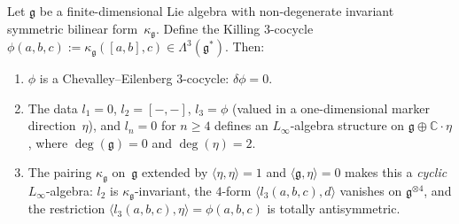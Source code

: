 \begin{proposition}\label{prop:killing-linf-extension}
Let $\mathfrak{g}$ be a finite-dimensional Lie algebra with
non-degenerate invariant symmetric bilinear form~$\kappa_{\mathfrak{g}}$.
Define the Killing $3$-cocycle
$\phi(a,b,c) := \kappa_{\mathfrak{g}}([a,b],c) \in \Lambda^3(\mathfrak{g}^*)$.
Then:
\begin{enumerate}[label=\textup{(\roman*)}]
\item $\phi$ is a Chevalley--Eilenberg $3$-cocycle:
 $\delta\phi = 0$.
\item The data $l_1 = 0$, $l_2 = [-,-]$,
 $l_3 = \phi$ \textup{(}valued in a one-dimensional marker
 direction~$\eta$\textup{)},
 and $l_n = 0$ for $n \geq 4$ defines an $L_\infty$-algebra
 structure on $\mathfrak{g} \oplus \mathbb{C}\cdot\eta$,
 where $\deg(\mathfrak{g}) = 0$ and $\deg(\eta) = 2$.
\item The pairing $\kappa_{\mathfrak{g}}$ on~$\mathfrak{g}$ extended by
 $\langle\eta,\eta\rangle = 1$ and
 $\langle\mathfrak{g},\eta\rangle = 0$ makes this a
 \emph{cyclic} $L_\infty$-algebra: $l_2$ is
 $\kappa_{\mathfrak{g}}$-invariant, the $4$-form
 $\langle l_3(a,b,c), d\rangle$ vanishes on
 $\mathfrak{g}^{\otimes 4}$, and the restriction
 $\langle l_3(a,b,c),\eta\rangle = \phi(a,b,c)$ is
 totally antisymmetric.
\end{enumerate}
\end{proposition}

